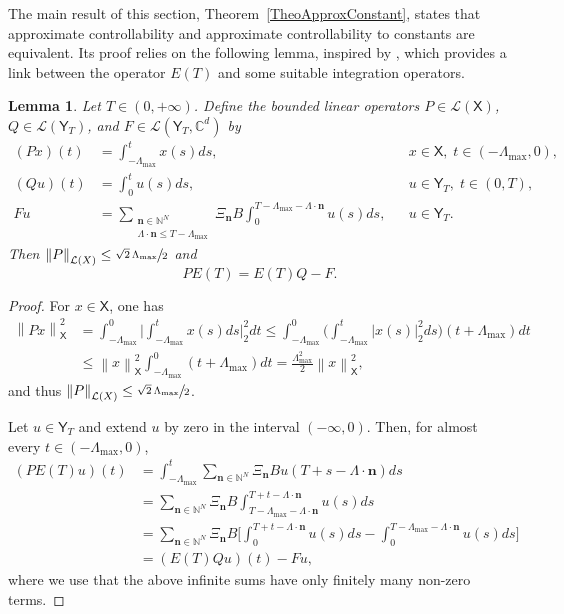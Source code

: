 \documentclass[10pt]{amsart}
\newcommand{\bn}{\boldsymbol{n}}
\theoremstyle{plain}
\newtheorem{lemm}[theo]{Lemma}
\theoremstyle{definition}
\newcommand{\norm}[1]{\left\lVert #1\right\lVert}
\newcommand{\abs}[1]{\left\lvert #1\right \rvert}
\newcommand{\bgabs}[1]{\biggl\lvert #1\biggr \rvert}
\begin{document}
The main result of this section, Theorem~\ref{TheoApproxConstant}, states that approximate controllability and approximate controllability to constants are equivalent. Its proof relies on the following lemma, inspired by \cite[Th.\,5.1]{Gohberg1989Inversion}, which provides a link between the operator $E(T)$ and some suitable integration operators.

\begin{lemm}
\label{LemmPETETQF}
Let $T \in (0, +\infty)$. Define the bounded linear operators $P \in \mathcal L(\mathsf X)$, $Q \in \mathcal L(\mathsf Y_T)$, and $F \in \mathcal L(\mathsf Y_T, \mathbb C^d)$ by
\begin{align*}
(P x)(t) & = \int_{-\Lambda_{\max}}^t x(s) ds, & & x \in \mathsf X,\; t \in (-\Lambda_{\max}, 0),  \\
(Q u)(t) & = \int_0^t u(s) ds, & & u \in \mathsf Y_T,\; t \in (0, T),  \\
F u & = \sum_{\substack{\bn \in \mathbb N^N \\ \Lambda \cdot \bn \leq T - \Lambda_{\max}}} \Xi_{\bn} B \int_0^{T - \Lambda_{\max} - \Lambda \cdot \bn} u(s) ds, & & u \in \mathsf Y_T.
\end{align*}
Then $\norm{P}_{\mathcal L(X)} \leq \sfrac{\sqrt{2}\,\Lambda_{\max}}{2}$ and
\begin{equation}
\label{EqPETETQF}
P E(T) = E(T) Q - F.
\end{equation}
\end{lemm}

\begin{proof}
For $x \in \mathsf X$, one has
\begin{align*}
\norm{P x}_{\mathsf X}^2 & = \int_{-\Lambda_{\max}}^0 \bgabs{\int_{-\Lambda_{\max}}^t x(s) ds}_2^2 dt \leq \int_{-\Lambda_{\max}}^0 \biggl(\int_{-\Lambda_{\max}}^t \abs{x(s)}_2^2 ds\biggr) (t + \Lambda_{\max}) dt  \\
& \leq \norm{x}_{\mathsf X}^2 \int_{-\Lambda_{\max}}^0 (t + \Lambda_{\max}) dt = \frac{\Lambda_{\max}^2}{2} \norm{x}_{\mathsf X}^2,
\end{align*}
and thus $\norm{P}_{\mathcal L(X)} \leq \sfrac{\sqrt{2}\,\Lambda_{\max}}{2}$.

Let $u \in \mathsf Y_T$ and extend $u$ by zero in the interval $(-\infty, 0)$. Then, for almost every $t \in (-\Lambda_{\max}, 0)$,
\begin{align*}
(P E(T) u)(t) & = \int_{-\Lambda_{\max}}^t \sum_{\bn \in \mathbb N^N} \Xi_{\bn} B u(T + s - \Lambda \cdot \bn) ds  \\
& = \sum_{\bn \in \mathbb N^N} \Xi_{\bn} B \int_{T - \Lambda_{\max} - \Lambda \cdot \bn}^{T + t - \Lambda \cdot \bn} u(s) ds  \\
& = \sum_{\bn \in \mathbb N^N} \Xi_{\bn} B \biggl[\int_0^{T + t - \Lambda \cdot \bn} u(s) ds - \int_0^{T - \Lambda_{\max} - \Lambda \cdot \bn} u(s) ds\biggr]  \\
& = (E(T) Q u)(t) - F u,
\end{align*}
where we use that the above infinite sums have only finitely many non-zero terms.
\end{proof}
\end{document}

